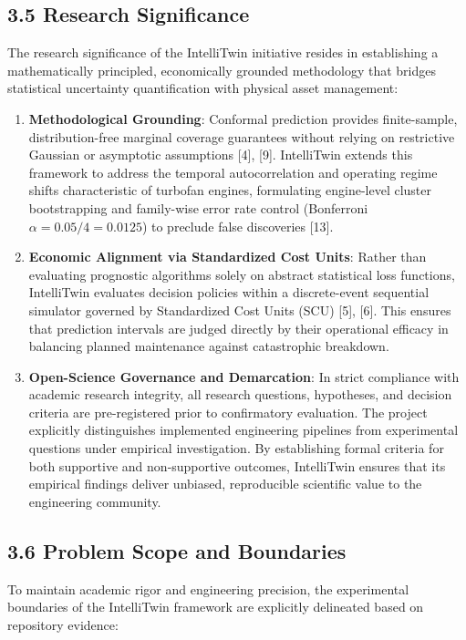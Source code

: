 \documentclass[12pt,a4paper]{article}
\begin{document}
\subsection*{3.5 Research Significance}
The research significance of the IntelliTwin initiative resides in establishing a mathematically principled, economically grounded methodology that bridges statistical uncertainty quantification with physical asset management:

\begin{enumerate}
    \item \textbf{Methodological Grounding}: Conformal prediction provides finite-sample, distribution-free marginal coverage guarantees without relying on restrictive Gaussian or asymptotic assumptions [4], [9]. IntelliTwin extends this framework to address the temporal autocorrelation and operating regime shifts characteristic of turbofan engines, formulating engine-level cluster bootstrapping and family-wise error rate control (Bonferroni $\alpha = 0.05 / 4 = 0.0125$) to preclude false discoveries [13].
    \item \textbf{Economic Alignment via Standardized Cost Units}: Rather than evaluating prognostic algorithms solely on abstract statistical loss functions, IntelliTwin evaluates decision policies within a discrete-event sequential simulator governed by Standardized Cost Units (SCU) [5], [6]. This ensures that prediction intervals are judged directly by their operational efficacy in balancing planned maintenance against catastrophic breakdown.
    \item \textbf{Open-Science Governance and Demarcation}: In strict compliance with academic research integrity, all research questions, hypotheses, and decision criteria are pre-registered prior to confirmatory evaluation. The project explicitly distinguishes implemented engineering pipelines from experimental questions under empirical investigation. By establishing formal criteria for both supportive and non-supportive outcomes, IntelliTwin ensures that its empirical findings deliver unbiased, reproducible scientific value to the engineering community.
\end{enumerate}

\subsection*{3.6 Problem Scope and Boundaries}
To maintain academic rigor and engineering precision, the experimental boundaries of the IntelliTwin framework are explicitly delineated based on repository evidence:
\end{document}
